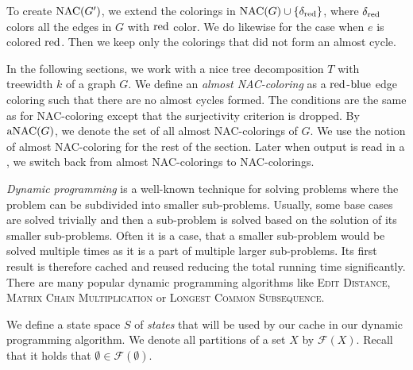 To create \( \operatorname{NAC}(G') \), we extend the colorings
in \( \operatorname{NAC}(G) \cup \{ \delta_{\text{red}} \} \), where \( \delta_{\text{red}} \)
colors all the edges in \( G \) with \( \text{red} \) color.
We do likewise for the case when \( e \) is colored \( \text{red} \).
Then we keep only the colorings that did not form an almost cycle.

In the following sections,
we work with a nice tree decomposition \( T \) with treewidth \( k \)
of a graph \( G \).
%
We define an \emph{almost NAC-coloring}
as a \( \text{red} \)-\( \text{blue} \) edge coloring such that there
are no almost cycles formed. The conditions are the same as for NAC-coloring
except that the surjectivity criterion is dropped.
By \( \operatorname{aNAC}(G) \), we denote the set of all almost NAC-colorings of \( G \).
We use the notion of almost NAC-coloring for the rest of the section.
Later when output is read in a \RootNode{},
we switch back from almost NAC-colorings to NAC-colorings.

\emph{Dynamic programming} is a well-known technique for solving problems
where the problem can be subdivided into smaller sub-problems.
Usually, some base cases are solved trivially and then a sub-problem
is solved based on the solution of its smaller sub-problems.
Often it is a case, that a smaller sub-problem would be solved multiple times
as it is a part of multiple larger sub-problems.
Its first result is therefore cached and reused reducing the total running time significantly.
There are many popular dynamic programming algorithms
like \textsc{Edit Distance}, \textsc{Matrix Chain Multiplication} or \textsc{Longest Common Subsequence}.

We define a state space \( S \) of \emph{states}
that will be used by our cache in our dynamic programming algorithm.
We denote all partitions of a set \( X \) by \( \mathcal{F}(X) \).
Recall that it holds that \( \emptyset \in \mathcal{F}(\emptyset) \).

